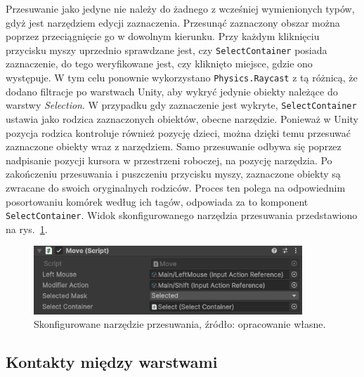 Przesuwanie jako jedyne nie należy do żadnego z wcześniej wymienionych typów,
gdyż jest narzędziem edycji zaznaczenia.
Przesunąć zaznaczony obszar można poprzez przeciągnięcie go w dowolnym kierunku.
Przy każdym kliknięciu przycisku myszy uprzednio sprawdzane jest,
czy \texttt{SelectContainer} posiada zaznaczenie,
do tego weryfikowane jest, czy kliknięto miejsce, gdzie ono występuje.
W tym celu ponownie wykorzystano \texttt{Physics.Raycast} z tą różnicą,
że dodano filtracje po warstwach Unity, aby wykryć jedynie obiekty należące do warstwy \textit{Selection}.
W przypadku gdy zaznaczenie jest wykryte, \texttt{SelectContainer} ustawia jako rodzica zaznaczonych obiektów,
obecne narzędzie.
Ponieważ w Unity pozycja rodzica kontroluje również pozycję dzieci,
można dzięki temu przesuwać zaznaczone obiekty wraz z narzędziem.
Samo przesuwanie odbywa się poprzez nadpisanie pozycji kursora w przestrzeni roboczej, na pozycję narzędzia.
%
Po zakończeniu przesuwania i puszczeniu przycisku myszy,
zaznaczone obiekty są zwracane do swoich oryginalnych rodziców.
Proces ten polega na odpowiednim posortowaniu komórek według ich tagów, 
odpowiada za to komponent \texttt{SelectContainer}.
Widok skonfigurowanego narzędzia przesuwania przedstawiono na rys.~\ref{fig:move}.

\begin{figure}[h!]
    \centering
    \includegraphics[width=0.9\textwidth]{chapters/chapter4/rys/tools/move}
    \caption[Skonfigurowane narzędzie przesuwania.]{Skonfigurowane narzędzie przesuwania, źródło: opracowanie własne.}
    \label{fig:move}
\end{figure}

\subsection{Kontakty między warstwami}
\label{subsec:kontakty}

